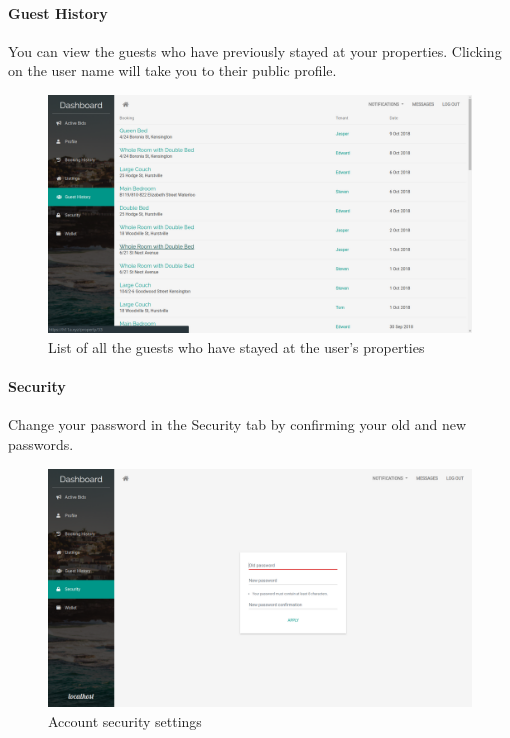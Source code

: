 \paragraph{Guest History}
You can view the guests who have previously stayed at your properties. Clicking
on the user name will take you to their public profile.
\begin{figure}[!h]
  \includegraphics[width=\linewidth]{assets/userManual/guestHistory.png}
  \caption{List of all the guests who have stayed at the user's properties}
  \label{fig:guestHistory}
\end{figure}

\paragraph{Security}
Change your password in the Security tab by confirming your old and new passwords.
\begin{figure}[!h]
  \includegraphics[width=\linewidth]{assets/userManual/security.png}
  \caption{Account security settings}
  \label{fig:securitySettings}
\end{figure}

